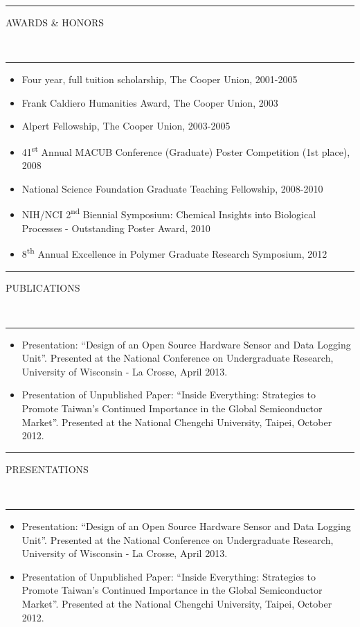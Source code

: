 \documentclass[10pt, letterpaper, oneside]{article}
\newcommand{\HRule}[2]{\textcolor{#1}{\rule{\linewidth}{#2}}}
\newcommand{\sectiontitle}[1]{\begin{minipage}{\textwidth}\HRule{black}{0.25mm}\vspace{-10pt}\begin{center}\Large\MakeUppercase{#1}\end{center}\end{minipage}\\\HRule{light-grey}{0.15mm}\vspace{\baselineskip}}
\newenvironment{tightressection}[1]{
  \begin{minipage}{\textwidth}
  \sectiontitle{#1}}
  {\vspace{\baselineskip}\end{minipage}}
\newenvironment{rescolumn}{
  \begin{minipage}{0.5\textwidth}
    \begin{itemize}[noitemsep,nolistsep]}
  {\end{itemize}
    \end{minipage}}
\newcommand{\resitem}[1]{
	\vspace{2pt}
	\item \begin{flushleft} #1 \end{flushleft}
}
\begin{document}
\vspace{15pt}
\begin{tightressection}{awards \& honors}
  \begin{rescolumn}
      \resitem{Four year, full tuition scholarship, The Cooper Union, 2001-2005}
      \resitem{Frank Caldiero Humanities Award, The Cooper Union, 2003}
      \resitem{Alpert Fellowship, The Cooper Union, 2003-2005}
      \resitem{41\textsuperscript{st} Annual MACUB Conference (Graduate) Poster Competition (1st place), 2008}
    \end{rescolumn}
  \begin{rescolumn}
      \resitem{National Science Foundation Graduate Teaching Fellowship, 2008-2010}
      \resitem{NIH/NCI 2\textsuperscript{nd} Biennial Symposium: Chemical Insights into Biological Processes - Outstanding Poster Award, 2010}
      \resitem{8\textsuperscript{th} Annual Excellence in Polymer Graduate Research Symposium, 2012}
    \end{rescolumn}
\end{tightressection}

\begin{tightressection}{publications}
  \begin{itemize}[noitemsep,nolistsep]
    \resitem{Presentation: ``Design of an Open Source Hardware Sensor and Data Logging Unit''.  Presented at the National Conference on Undergraduate Research, University of Wisconsin - La Crosse, April 2013.}
    \resitem{Presentation of Unpublished Paper: ``Inside Everything: Strategies to Promote Taiwan's Continued Importance in the Global Semiconductor Market''. Presented at the National Chengchi University, Taipei, October 2012.}
  \end{itemize}
\end{tightressection}

\begin{tightressection}{presentations}
  \begin{itemize}[noitemsep,nolistsep]
    \resitem{Presentation: ``Design of an Open Source Hardware Sensor and Data Logging Unit''.  Presented at the National Conference on Undergraduate Research, University of Wisconsin - La Crosse, April 2013.}
    \resitem{Presentation of Unpublished Paper: ``Inside Everything: Strategies to Promote Taiwan's Continued Importance in the Global Semiconductor Market''. Presented at the National Chengchi University, Taipei, October 2012.}
  \end{itemize}
\end{tightressection}
\end{document}
